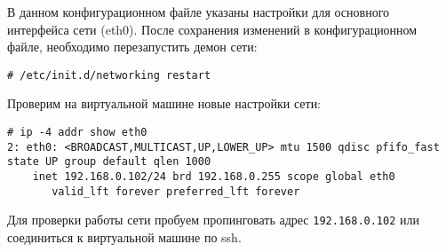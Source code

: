 В данном конфигурационном файле указаны настройки для основного интерфейса сети (eth0).
После сохранения изменений в конфигурационном файле, необходимо перезапустить демон сети:
\begin{lstlisting}
# /etc/init.d/networking restart
\end{lstlisting}

Проверим на виртуальной машине новые настройки сети:
\begin{lstlisting}
# ip -4 addr show eth0
2: eth0: <BROADCAST,MULTICAST,UP,LOWER_UP> mtu 1500 qdisc pfifo_fast state UP group default qlen 1000
    inet 192.168.0.102/24 brd 192.168.0.255 scope global eth0
       valid_lft forever preferred_lft forever
\end{lstlisting}

Для проверки работы сети пробуем пропинговать адрес \texttt{192.168.0.102} или соединиться к виртуальной машине по ssh.

\clearpage
